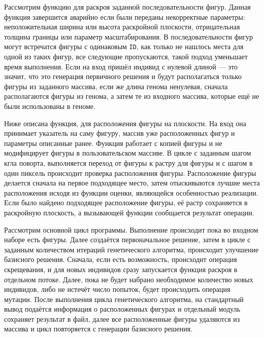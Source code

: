 \documentclass[14pt]{extarticle}
\begin{document}
	Рассмотрим функцию для раскроя заданной последовательности фигур. Данная функция завершится аварийно если были переданы некорректные параметры: неположительная ширина или высота раскройной плоскости, отрицательная толщина границы или параметр масштабирования. В последовательности фигур могут встречатся фигуры с одинаковым \lstinline|ID|, как только не нашлось места для одной из таких фигур, все следующие пропускаются, такой подход уменьшает время выполнения. Если  на вход пришёл индивид с нулевой длиной --- это значит, что это генерация первичного решения и будут располагаться только фигуры из заданного массива, если же длина генома ненулевая, сначала располагаются фигуры из генома, а затем те из входного массива, которые ещё не были использованы в геноме.
	
	
	Ниже описана функция, для расположения фигуры на плоскости. На вход она принимает указатель на саму фигуру, массив уже расположенных фигур и параметры описанные ранее. Функция работает с копией фигуры и не модифицирует фигуры в пользовательском массиве. В цикле с заданным шагом кгла поворта, выполняется переход от фигуры к растру для фигуры и с шагом в один пиксель происходит проверка расположения фигуры. Расположение фигуры делается сначала на первое подходящее место, затем отыскивыются лучшие места расположения исходя из функции оценки, являющейся особенностью реализации. Если было найдено подходящее расположение фигуры, её растр сохраняется в раскройную плоскость, а вызывающей функции сообщается результат операции.
	
	
	Рассмотрим основной цикл программы. Выполнение происходит пока во входном наборе есть фигуры. Далее создаётся первоначальное решение, затем в цикле с заданным количеством итераций генетического алгоритма, происходит улучшение базисного решения. Сначала, если есть возможность, происходит операция скрещевания, и для новых индивидов сразу запускается функция раскроя в отдельном потоке. Далее, пока не будет набрано необходимое количество новых индивидов, либо не истечёт число попыток, будет происходить операция мутации. После выполнения цикла генетического алгоритма, на стандартный вывод подаётся информация о расположенных фигурах и отдельный модуль сохраняет результат в файл, далее все расположенные фигуры удаляются из массива и цикл повторяется с генерации базисного решения.
	
	
\end{document}
